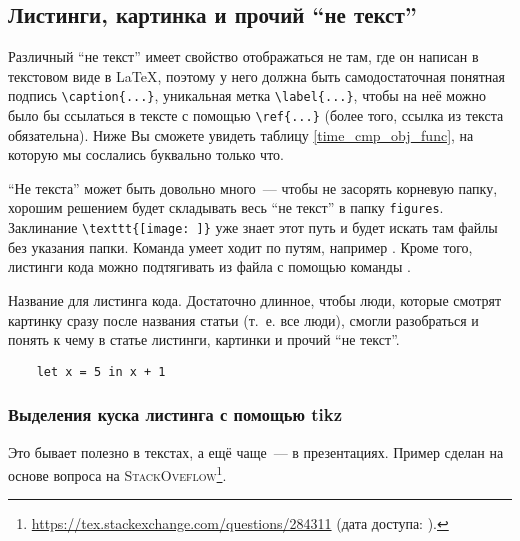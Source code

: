 \subsection{Листинги, картинка и прочий \enquote{не текст}}

Различный \enquote{не текст} имеет свойство отображаться не там, где он написан в текстовом виде в \LaTeX{}, поэтому у него должна быть самодостаточ\-ная понятная подпись \verb=\caption{...}=, уникальная метка \verb=\label{...}=, чтобы на неё можно было бы ссылаться в тексте с помощью \verb=\ref{...}= (более того, ссылка из текста обязательна). Ниже Вы сможете увидеть таблицу \ref{time_cmp_obj_func}, на которую мы сослались буквально только что.

\enquote{Не текста} может быть довольно много~--- чтобы не засорять корневую папку, хорошим решением будет складывать весь \enquote{не текст} в папку \texttt{figures}.
Заклинание \verb=\texttt{[image: ]}= уже знает этот путь и будет искать там файлы без указания папки.
Команда \verb== умеет ходит по путям, например \verb==.
Кроме того, листинги кода можно подтягивать из файла с помощью команды \verb==.


\begin{listing}
    \caption{Название для листинга кода. Достаточно длинное, чтобы люди, которые смотрят картинку сразу после названия статьи (т.~е. все люди), смогли разобраться и понять к чему в статье листинги, картинки и прочий \enquote{не текст}.}
    \begin{verbatim}
    let x = 5 in x + 1
  \end{verbatim}
\end{listing}

\subsubsection{Выделения куска листинга с помощью tikz}
Это бывает полезно в текстах, а ещё чаще~--- в презентациях. Пример сделан на основе вопроса на \textsc{StackOveflow}\footnote{\url{https://tex.stackexchange.com/questions/284311} (дата доступа: ).}.

